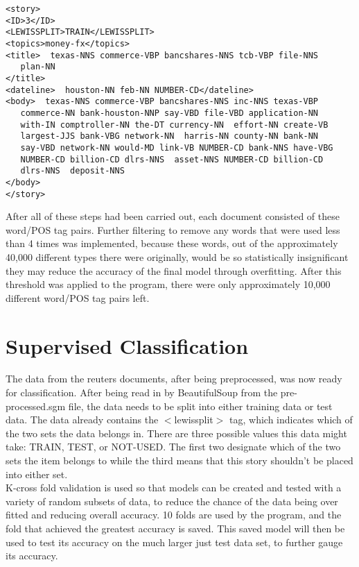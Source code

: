 \documentclass[11pt]{article}
\begin{document}
\begin{lstlisting}[frame=single]
<story>
<ID>3</ID>
<LEWISSPLIT>TRAIN</LEWISSPLIT>
<topics>money-fx</topics>
<title>  texas-NNS commerce-VBP bancshares-NNS tcb-VBP file-NNS
   plan-NN
</title>
<dateline>  houston-NN feb-NN NUMBER-CD</dateline>
<body>  texas-NNS commerce-VBP bancshares-NNS inc-NNS texas-VBP
   commerce-NN bank-houston-NNP say-VBD file-VBD application-NN
   with-IN comptroller-NN the-DT currency-NN  effort-NN create-VB
   largest-JJS bank-VBG network-NN  harris-NN county-NN bank-NN
   say-VBD network-NN would-MD link-VB NUMBER-CD bank-NNS have-VBG
   NUMBER-CD billion-CD dlrs-NNS  asset-NNS NUMBER-CD billion-CD
   dlrs-NNS  deposit-NNS
</body>
</story>
\end{lstlisting}

After all of these steps had been carried out, each document consisted of these word/POS tag pairs. Further filtering to remove any words that were used less than 4 times was implemented, because these words, out of the approximately 40,000 different types there were originally, would be so statistically insignificant they may reduce the accuracy of the final model through overfitting. After this threshold was applied to the program, there were only approximately 10,000 different word/POS tag pairs left.

\section{Supervised Classification}
The data from the reuters documents, after being preprocessed, was now ready for classification. After being read in by BeautifulSoup from the pre-processed.sgm file, the data needs to be split into either training data or test data. The data already contains the $<$lewissplit$>$ tag, which indicates which of the two sets the data belongs in. There are three possible values this data might take: TRAIN, TEST, or NOT-USED. The first two designate which of the two sets the item belongs to while the third means that this story shouldn’t be placed into either set. \\

K-cross fold validation is used so that models can be created and tested with a variety of random subsets of data, to reduce the chance of the data being over fitted and reducing overall accuracy. 10 folds are used by the program, and the fold that achieved the greatest accuracy is saved. This saved model will then be used to test its accuracy on the much larger just test data set, to further gauge its accuracy. \\
\end{document}
